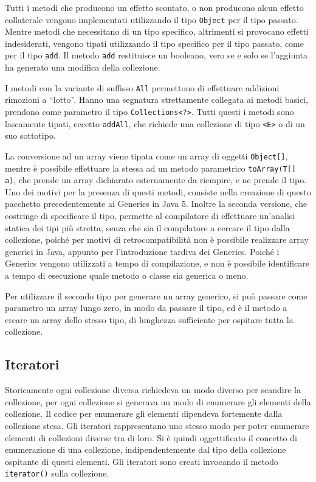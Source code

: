 \documentclass{article}
\numberwithin{equation}{subsection}
\begin{document}
Tutti i metodi che producono un effetto scontato, o non producono alcun effetto collaterale vengono implementati utilizzando il tipo \verb|Object| per il tipo passato. 
Mentre metodi che necessitano di un tipo specifico, altrimenti si provocano effetti indesiderati, vengono tipati utilizzando il tipo specifico per il tipo passato, come per il 
tipo \verb|add|.
Il metodo \verb|add| restituisce un booleano, vero se e solo se l'aggiunta ha generato una modifica della collezione. 


I metodi con la variante di suffisso \verb|All| permettono di effettuare addizioni rimozioni a ``lotto''. Hanno una segnatura strettamente collegata ai metodi basici, 
prendono come parametro il tipo \verb|Collections<?>|. Tutti questi i metodi sono lascamente tipati, eccetto \verb|addAll|, che richiede una collezione di tipo \verb|<E>| o di 
un suo sottotipo. 

La conversione ad un array viene tipata come un array di oggetti \verb|Object[]|, mentre è possibile effettuare la stessa ad un metodo parametrico \verb|toArray(T[] a)|, che 
prende un array dichiarato esternamente da riempire, e ne prende il tipo. 
Uno dei motivi per la presenza di questi metodi, consiste nella creazione di questo pacchetto precedentemente ai Generics in Java 5. Inoltre la seconda versione, che costringe di 
specificare il tipo, permette al compilatore di effettuare un'analisi statica dei tipi più stretta, senza che sia il compilatore a cercare il tipo dalla collezione, poiché 
per motivi di retrocompatibilità non è possibile realizzare array generici in Java, appunto per l'introduzione tardiva dei Generics. Poiché i Generics vengono utilizzati a 
tempo di compilazione, e non è possibile identificare a tempo di esecuzione quale metodo o classe sia generica o meno. 

Per utilizzare il secondo tipo per generare un array generico, si può passare come parametro un array lungo zero, in modo da passare il tipo, ed è il metodo a creare un array 
dello stesso tipo, di lunghezza sufficiente per ospitare tutta la collezione. 

\subsection{Iteratori}

Storicamente ogni collezione diversa richiedeva un modo diverso per scandire la collezione, per ogni collezione si generava un modo di enumerare gli elementi della collezione. 
Il codice per enumerare gli elementi dipendeva fortemente dalla collezione stesa. Gli iteratori rappresentano uno stesso modo per poter enumerare elementi di collezioni diverse 
tra di loro. 
Si è quindi oggettificato il concetto di enumerazione di una collezione, indipendentemente dal tipo della collezione ospitante di questi elementi. Gli iteratori 
sono creati invocando il metodo \verb|iterator()| sulla collezione. 
\end{document}
